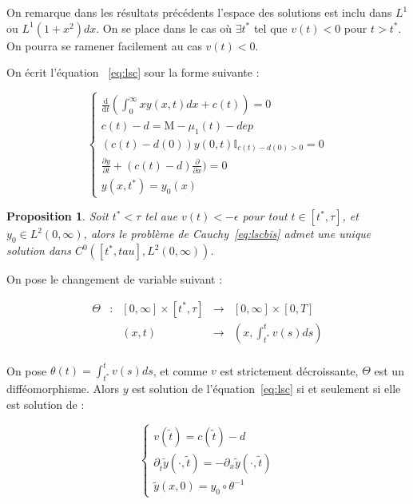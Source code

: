 \documentclass[a4paper]{article}
\newtheorem{prop}{Proposition}[section]
\theoremstyle{definition}
\theoremstyle{remark}
\newcommand{\mass}{\mathrm{M}}
\newcommand{\dep}{d}
\begin{document}
On remarque dans les résultats précédents l'espace des solutions est inclu dans $L^1$ ou $L^1(1+x^2)dx$. On se place dans le cas où $\exists t^*$ tel que $v(t)<0$ pour $t>t^*$. On pourra se ramener facilement au cas $v(t)<0$.

On écrit l'équation ~\eqref{eq:lsc} sour la forme suivante :

\begin{equation}
	\label{eq:lscbis}
\begin{cases}
	\displaystyle \frac{\mathrm{d}}{\mathrm{d}t} (\int_0^\infty x y(x,t)dx + c(t)) = 0 \\
	c(t) - \dep = \mass - \mu_1(t) - dep \\
	(c(t)-\dep(0))y(0,t)\mathbb{I}_{c(t)-\dep(0) > 0} = 0 \\
	\displaystyle \frac{\partial y}{\partial t}+ (c(t)-\dep) \frac{\partial}{\partial x}) = 0 \\
	y(x,t^*) = y_0(x)
\end{cases}
\end{equation}

\begin{prop} 
	Soit $t^* < \tau$ tel aue $v(t)< - \epsilon$ pour tout $t \in [t^*, \tau]$, et $y_0 \in L^2(0,\infty)$, alors le problème de Cauchy~\eqref{eq:lscbis} admet une unique solution dans $C^0([t^*,tau],L^2(0,\infty))$.
\end{prop}

On pose le changement de variable suivant :

 \begin{equation}
	\begin{array}{ccccc}
	\Theta & : & [0,\infty] \times [t^*,\tau]& \to & [0,\infty] \times [0,T] \\
	      &    &        (x,t)             & \to &  (x, \int_{t^*}^t v(s)ds)\\
	\end{array}
\end{equation}

On pose $\theta (t) = \int_{t^*}^t v(s)ds$, et comme $v$ est strictement décroissante, $\Theta$ est un difféomorphisme. Alors $y$ est solution de l'équation~\eqref{eq:lsc} si et seulement si elle est solution de :

\begin{equation}
	\label{eq:lstrsp}
\begin{cases}
	v(\tilde{t}) = c(\tilde{t}) - \dep \\
	\displaystyle \partial _{\tilde{t}} \tilde{y}(\cdot,\tilde{t}) = - \partial_{x} \tilde{y}(\cdot, \tilde{t})\\
	\tilde{y}(x,0) = y_0 \circ \theta^{-1}
\end{cases}
\end{equation}
\end{document}

